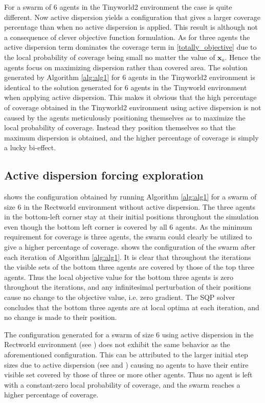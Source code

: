 For a swarm of 6 agents in the Tinyworld2 environment the case is quite different. Now active dispersion yields a configuration that gives a larger coverage percentage than when no active
dispersion is applied. This result is although not a consequence of clever objective function formulation. As for three agents the active dispersion term dominates the coverage term
in \eqref{totally_objective} due to the local probability of coverage being small no matter the value of $\mathbf{x}_{a}$. Hence the agents focus on maximizing dispersion rather than covered area. The 
solution generated by Algorithm \ref{alg:alg1} for 6 agents in the Tinyworld2 environment is identical to the solution generated for 6 agents in the Tinyworld environment when applying active dispersion. 
This makes it obvious that the high percentage of coverage obtained in the Tinyworld2 environment using active dispersion is not caused by the agents meticulously positioning themselves as to maximize the local
probability of coverage. Instead they position themselves so that the maximum dispersion is obtained, and the higher percentage of coverage is simply a lucky bi-effect.


\subsection{Active dispersion forcing exploration}

 shows the configuration obtained
by running Algorithm \ref{alg:alg1} for a swarm of size 6 in the Rectworld environment  without active dispersion. The three agents in the bottom-left corner stay
at their initial positions throughout the simulation even though the bottom left corner is covered by all 6 agents. As the minimum requirement for coverage is three agents, the swarm could 
clearly be utilized to give a higher percentage of coverage.  shows the configuration of the swarm after each iteration of Algorithm \ref{alg:alg1}. It is clear that 
throughout the iterations the visible sets of the bottom three agents are covered by those of the top three agents. Thus the local objective value for the bottom three agents is zero 
throughout the iterations, and any infinitesimal perturbation of their positions cause no change to the objective value, i.e. zero gradient. The SQP solver concludes that the bottom three agents are at local
optima at each iteration, and no change is made to their position. 

The configuration generated for a swarm of size 6 using active dispersion in the Rectworld environment (see ) does not exhibit the same behavior as the aforementioned configuration. This can be attributed to the
larger initial step sizes due to active dispersion (see  and ) causing no agents to have their entire visible set covered by those of three or more other agents.
Thus no agent is left with a constant-zero local probability of coverage, and the swarm reaches a higher percentage of coverage.

